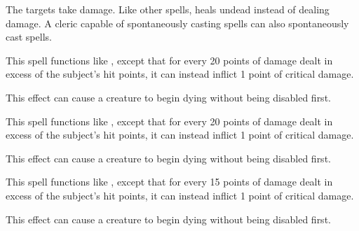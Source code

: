 \spellrng{\rngclose}
\begin{spellnotes}
  The targets take damage. Like other  spells,  heals undead instead of dealing damage. A cleric capable of spontaneously casting  spells can also spontaneously cast  spells.
\end{spellnotes}

\begin{spelleffect}
  This spell functions like , except that for every 20 points of damage dealt in excess of the subject's hit points, it can instead inflict 1 point of critical damage.
\end{spelleffect}
\begin{spellnotes}
  This effect can cause a creature to begin dying without being disabled first.
\end{spellnotes}

\begin{spelleffect}
  This spell functions like , except that for every 20 points of damage dealt in excess of the subject's hit points, it can instead inflict 1 point of critical damage.
\end{spelleffect}
\begin{spellnotes}
  This effect can cause a creature to begin dying without being disabled first.
\end{spellnotes}

\begin{spelleffect}
  This spell functions like , except that for every 15 points of damage dealt in excess of the subject's hit points, it can instead inflict 1 point of critical damage.
\end{spelleffect}
\begin{spellnotes}
  This effect can cause a creature to begin dying without being disabled first.
\end{spellnotes}

